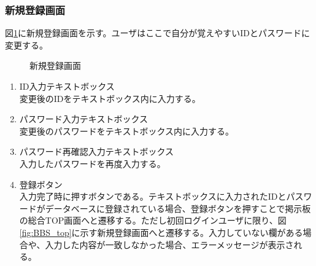 \documentclass[a4j]{jarticle}
\begin{document}
\subsubsection{新規登録画面}
図\ref{fig:subscribe_user}に新規登録画面を示す。ユーザはここで自分が覚えやすいIDとパスワードに変更する。
\begin{figure}[H]
\centering
{}
\caption{新規登録画面}
\label{fig:subscribe_user}
\end{figure}
\begin{enumerate}
  \renewcommand{\labelenumi}{\textcircled{\scriptsize \theenumi}}

\item ID入力テキストボックス\\
変更後のIDをテキストボックス内に入力する。
\item パスワード入力テキストボックス\\
変更後のパスワードをテキストボックス内に入力する。
\item パスワード再確認入力テキストボックス\\
入力したパスワードを再度入力する。
\item 登録ボタン\\
入力完了時に押すボタンである。テキストボックスに入力されたIDとパスワードがデータベースに登録されている場合、登録ボタンを押すことで掲示板の総合TOP画面へと遷移する。ただし初回ログインユーザに限り、図\ref{fig:BBS_top}に示す新規登録画面へと遷移する。入力していない欄がある場合や、入力した内容が一致しなかった場合、エラーメッセージが表示される。

\end{enumerate}
\end{document}
